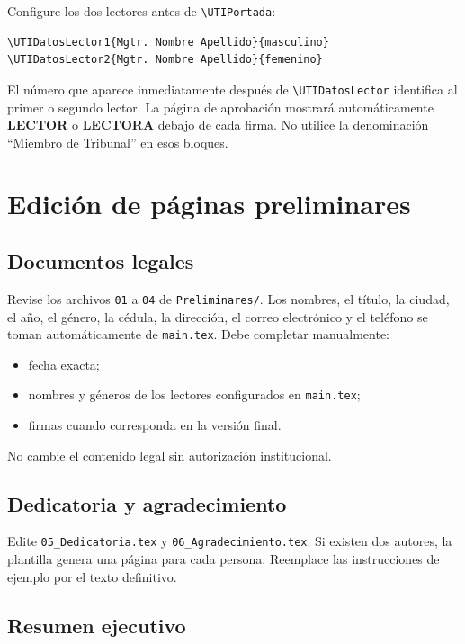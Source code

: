 \documentclass[12pt,a4paper,oneside]{report}
\begin{document}
Configure los dos lectores antes de \texttt{\textbackslash UTIPortada}:

\begin{lstlisting}
\UTIDatosLector1{Mgtr. Nombre Apellido}{masculino}
\UTIDatosLector2{Mgtr. Nombre Apellido}{femenino}
\end{lstlisting}

El número que aparece inmediatamente después de \texttt{\textbackslash UTIDatosLector} identifica al primer o segundo lector. La página de aprobación mostrará automáticamente \textbf{LECTOR} o \textbf{LECTORA} debajo de cada firma. No utilice la denominación ``Miembro de Tribunal'' en esos bloques.

\chapter{Edición de páginas preliminares}

\section{Documentos legales}

Revise los archivos \texttt{01} a \texttt{04} de \texttt{Preliminares/}. Los nombres, el título, la ciudad, el año, el género, la cédula, la dirección, el correo electrónico y el teléfono se toman automáticamente de \texttt{main.tex}. Debe completar manualmente:

\begin{itemize}
  \item fecha exacta;
  \item nombres y géneros de los lectores configurados en \texttt{main.tex};
  \item firmas cuando corresponda en la versión final.
\end{itemize}

No cambie el contenido legal sin autorización institucional.

\section{Dedicatoria y agradecimiento}

Edite \texttt{05\_Dedicatoria.tex} y \texttt{06\_Agradecimiento.tex}. Si existen dos autores, la plantilla genera una página para cada persona. Reemplace las instrucciones de ejemplo por el texto definitivo.

\section{Resumen ejecutivo}
\end{document}

